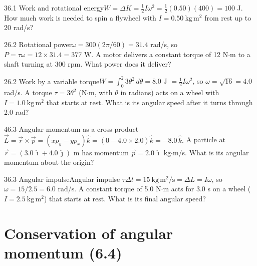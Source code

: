 \documentclass[11pt]{article}
\begin{document}
\begin{q}{3}{6.1 Work and rotational energy}{$W = \Delta K = \tfrac12 I\omega^2 = \tfrac12(0.50)(400) = 100$ J.}
How much work is needed to spin a flywheel with $I = 0.50\ \mathrm{kg\,m^2}$ from rest up to 20 rad/s?
\end{q}
\begin{q}{2}{6.2 Rotational power}{$\omega = 300(2\pi/60) = 31.4$ rad/s, so $P = \tau\omega = 12 \times 31.4 = 377$ W.}
A motor delivers a constant torque of 12 N$\cdot$m to a shaft turning at 300 rpm. What power does it deliver?
\end{q}
\begin{q}{2}{6.2 Work by a variable torque}{$W = \int_0^2 3\theta^2\,d\theta = 8.0$ J $= \tfrac12 I\omega^2$, so $\omega = \sqrt{16} = 4.0$ rad/s.}
A torque $\tau = 3\theta^2$ (N$\cdot$m, with $\theta$ in radians) acts on a wheel with $I = 1.0\ \mathrm{kg\,m^2}$ that starts at rest. What is its angular speed after it turns through 2.0 rad?
\end{q}
\begin{q}{4}{6.3 Angular momentum as a cross product}{$\vec L = \vec r\times\vec p = (xp_y - yp_x)\hat k = (0 - 4.0 \times 2.0)\hat k = -8.0\,\hat k$.}
A particle at $\vec r = (3.0\,\hat\imath + 4.0\,\hat\jmath)$ m has momentum $\vec p = 2.0\,\hat\imath$ kg$\cdot$m/s. What is its angular momentum about the origin?
\end{q}
\begin{q}{3}{6.3 Angular impulse}{Angular impulse $\tau\Delta t = 15\ \mathrm{kg\,m^2/s} = \Delta L = I\omega$, so $\omega = 15/2.5 = 6.0$ rad/s.}
A constant torque of 5.0 N$\cdot$m acts for 3.0 s on a wheel ($I = 2.5\ \mathrm{kg\,m^2}$) that starts at rest. What is its final angular speed?
\end{q}

\section{Conservation of angular momentum (6.4)}
\end{document}
